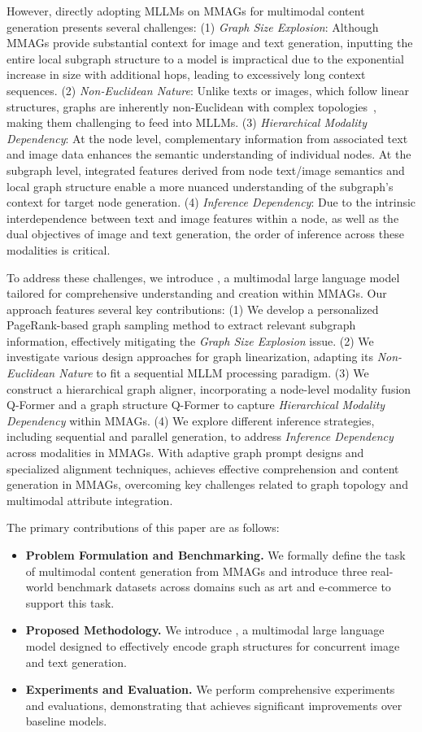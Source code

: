 However, directly adopting MLLMs on MMAGs for multimodal content generation presents several challenges:
(1) \textit{Graph Size Explosion}: Although MMAGs provide substantial context for image and text generation, inputting the entire local subgraph structure to a model is impractical due to the exponential increase in size with additional hops, leading to excessively long context sequences.
(2) \textit{Non-Euclidean Nature}: Unlike texts or images, which follow linear structures, graphs are inherently non-Euclidean with complex topologies~\cite{bronstein2017geometric}, making them challenging to feed into MLLMs. 
(3) \textit{Hierarchical Modality Dependency}: At the node level, complementary information from associated text and image data enhances the semantic understanding of individual nodes. At the subgraph level, integrated features derived from node text/image semantics and local graph structure enable a more nuanced understanding of the subgraph's context for target node generation.
(4) \textit{Inference Dependency}: Due to the intrinsic interdependence between text and image features within a node, as well as the dual objectives of image and text generation, the order of inference across these modalities is critical.

To address these challenges, we introduce \Ours, a multimodal large language model tailored for comprehensive understanding and creation within MMAGs. Our approach features several key contributions:
(1) We develop a personalized PageRank-based graph sampling method to extract relevant subgraph information, effectively mitigating the \textit{Graph Size Explosion} issue.
(2) We investigate various design approaches for graph linearization, adapting its \textit{Non-Euclidean Nature} to fit a sequential MLLM processing paradigm.
(3) We construct a hierarchical graph aligner, incorporating a node-level modality fusion Q-Former and a graph structure Q-Former to capture \textit{Hierarchical Modality Dependency} within MMAGs.
(4) We explore different inference strategies, including sequential and parallel generation, to address \textit{Inference Dependency} across modalities in MMAGs.
With adaptive graph prompt designs and specialized alignment techniques, \Ours achieves effective comprehension and content generation in MMAGs, overcoming key challenges related to graph topology and multimodal attribute integration.

The primary contributions of this paper are as follows:
\begin{itemize}
\item \textbf{Problem Formulation and Benchmarking.} We formally define the task of multimodal content generation from MMAGs and introduce three real-world benchmark datasets across domains such as art and e-commerce to support this task.
\item \textbf{Proposed Methodology.} We introduce \Ours, a multimodal large language model designed to effectively encode graph structures for concurrent image and text generation.
\item \textbf{Experiments and Evaluation.} We perform comprehensive experiments and evaluations, demonstrating that \Ours achieves significant improvements over baseline models.
\end{itemize}

